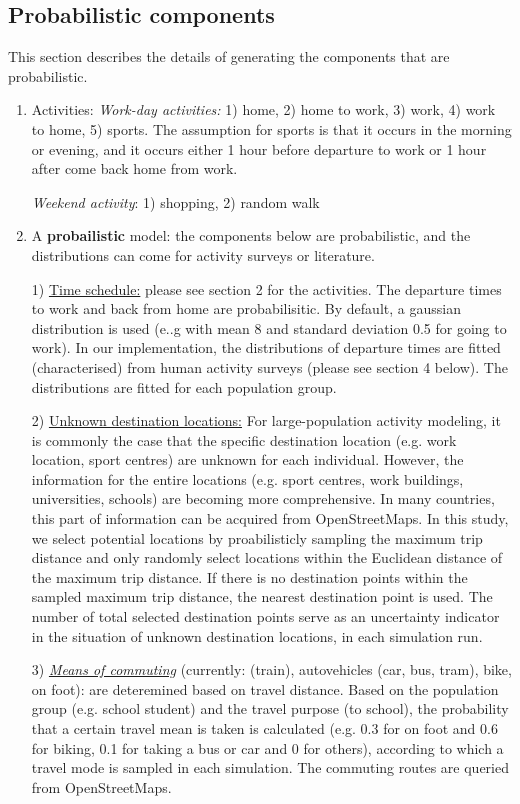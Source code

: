 \documentclass[]{article}
\begin{document}
\subsection{Probabilistic components}
This section describes the details of generating the components that are probabilistic.  
\begin{enumerate}
\def\labelenumi{\arabic{enumi}.}
\item
  Activities:
  \emph{Work-day activities:} 1) home, 2) home to work, 3) work, 4) work
  to home, 5) sports. The assumption for sports is that it occurs in the
  morning or evening, and it occurs either 1 hour before departure to
  work or 1 hour after come back home from work.

  \emph{Weekend activity}: 1) shopping, 2) random walk 
\item
  A \textbf{probailistic} model: the components below are probabilistic,
  and the distributions can come for activity surveys or literature.

  1) \underline{Time schedule:} please see section 2 for the activities.
  The departure times to work and back from home are probabilisitic. By
  default, a gaussian distribution is used (e..g with mean 8 and
  standard deviation 0.5 for going to work). In our implementation, the
  distributions of departure times are fitted (characterised) from human
  activity surveys (please see section 4 below). The distributions are
  fitted for each population group.

  2) \underline{Unknown destination locations:} For large-population
  activity modeling, it is commonly the case that the specific
  destination location (e.g. work location, sport centres) are unknown
  for each individual. However, the information for the entire locations
  (e.g. sport centres, work buildings, universities, schools) are
  becoming more comprehensive. In many countries, this part of
  information can be acquired from OpenStreetMaps. In this study, we
  select potential locations by proabilisticly sampling the maximum trip
  distance and only randomly select locations within the Euclidean
  distance of the maximum trip distance. If there is no destination
  points within the sampled maximum trip distance, the nearest
  destination point is used. The number of total selected destination
  points serve as an uncertainty indicator in the situation of unknown
  destination locations, in each simulation run.

  3) \emph{\underline{Means of commuting}} (currently: (train),
  autovehicles (car, bus, tram), bike, on foot): are deteremined based
  on travel distance. Based on the population group (e.g. school
  student) and the travel purpose (to school), the probability that a
  certain travel mean is taken is calculated (e.g. 0.3 for on foot and
  0.6 for biking, 0.1 for taking a bus or car and 0 for others),
  according to which a travel mode is sampled in each simulation. The
  commuting routes are queried from OpenStreetMaps.


\end{enumerate}
\end{document}
